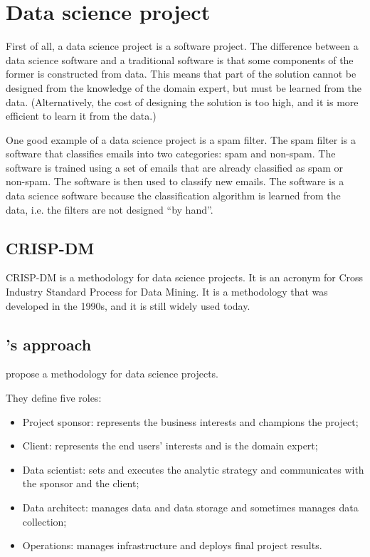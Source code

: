 \chapter{Data science project}


First of all, a data science project is a software project.  The difference between a data
science software and a traditional software is that some components of the former is
constructed from data.  This means that part of the solution cannot be designed from the
knowledge of the domain expert, but must be learned from the data.  (Alternatively, the
cost of designing the solution is too high, and it is more efficient to learn it from the data.)

One good example of a data science project is a spam filter.  The spam filter is a software
that classifies emails into two categories: spam and non-spam.  The software is trained
using a set of emails that are already classified as spam or non-spam.  The software is
then used to classify new emails.  The software is a data science software because the
classification algorithm is learned from the data, i.e. the filters are not designed ``by
hand''.


\section{CRISP-DM}

CRISP-DM is a methodology for data science projects.  It is an acronym for Cross Industry
Standard Process for Data Mining.  It is a methodology that was developed in the 1990s, and
it is still widely used today.

\section{\citeauthor{Zumel2019}'s approach}

\textcite{Zumel2019} propose a methodology for data science projects.

They define five roles:
\begin{itemize}
  \item Project sponsor: represents the business interests and champions the project;
  \item Client: represents the end users’ interests and is the domain expert;
  \item Data scientist: sets and executes the analytic strategy and communicates with the
    sponsor and the client;
  \item Data architect: manages data and data storage and sometimes manages data
    collection;
  \item Operations: manages infrastructure and deploys final project results.
\end{itemize}

